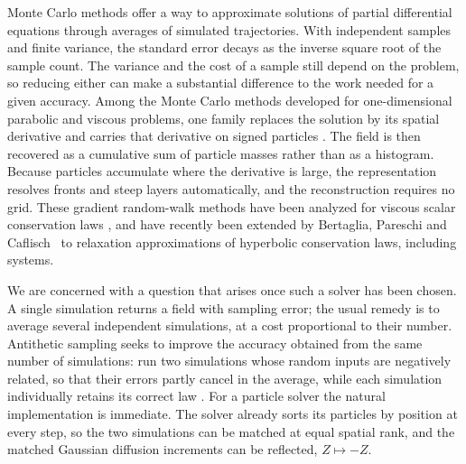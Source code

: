 \documentclass[smallextended,nospthms]{svjour3}
\theoremstyle{plain}
\theoremstyle{definition}
\theoremstyle{remark}
\numberwithin{equation}{section}
\begin{document}
Monte Carlo methods offer a way to approximate solutions of partial
differential equations through averages of simulated trajectories. With
independent samples and finite variance, the standard error decays as the
inverse square root of the sample count. The variance and the cost of a sample
still depend on the problem, so reducing either can make a substantial
difference to the work needed for a given accuracy. Among the Monte Carlo
methods developed for one-dimensional
parabolic and viscous problems, one family replaces the solution by its spatial
derivative and carries that derivative on signed particles
\citep{ghoniem1985,shermanpeskin1986,shermanpeskin1988,roberts1989,shermanmascagni1994}.
The field is then recovered as a cumulative sum of particle masses rather than
as a histogram. Because particles accumulate where the derivative is large, the
representation resolves fronts and steep layers automatically, and the
reconstruction requires no grid. These gradient random-walk methods have been
analyzed for viscous scalar conservation laws
\citep{roberts1989,bossytalay1997,bossy2004,bossyjourdain2002,jourdain2000,bencheikh2020,towers2025},
and have recently been extended by Bertaglia, Pareschi and
Caflisch~\citep{bertaglia2024} to relaxation approximations of hyperbolic
conservation laws, including systems.

We are concerned with a question that arises once such a solver has been
chosen. A single simulation returns a field with sampling error; the usual
remedy is to average several independent simulations, at a cost proportional to
their number. Antithetic sampling seeks to improve the accuracy obtained from
the same number of simulations: run two
simulations whose random inputs are negatively related, so that their errors
partly cancel in the average, while each simulation individually retains its
correct law \citep{hammersley1956,glasserman2004}. For a particle solver the
natural implementation is immediate. The solver already sorts its particles by
position at every step, so the two simulations can be matched at equal spatial
rank, and the matched Gaussian diffusion increments can be reflected,
$Z\mapsto-Z$.
\end{document}
